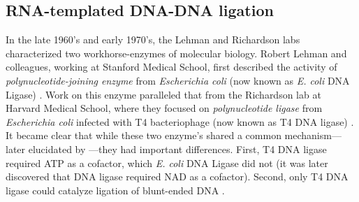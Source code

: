   \subsection{RNA-templated DNA-DNA ligation}
    \label{Intro:subsec:Ligation}

    In the late 1960's and early 1970's, the Lehman and Richardson labs characterized two workhorse-enzymes of molecular biology. Robert Lehman and colleagues, working at Stanford Medical School, first described the activity of \textit{polynucleotide-joining enzyme} from \textit{Escherichia coli} (now known as \textit{E. coli} DNA Ligase) \citep{Olivera1967b}. Work on this enzyme paralleled that from the Richardson lab at Harvard Medical School, where they focused on \textit{polynucleotide ligase} from \textit{Escherichia coli} infected with T4 bacteriophage (now known as T4 DNA ligase) \citep{Weiss1967a}. It became clear that while these two enzyme's shared a common mechanism---later elucidated by \citet{Modrich1973a}---they had important differences. First, T4 DNA ligase required ATP as a cofactor, which \textit{E. coli} DNA Ligase did not (it was later discovered that DNA ligase required NAD as a cofactor). Second, only T4 DNA ligase could catalyze ligation of blunt-ended DNA \citep{Tabor1987a}.

